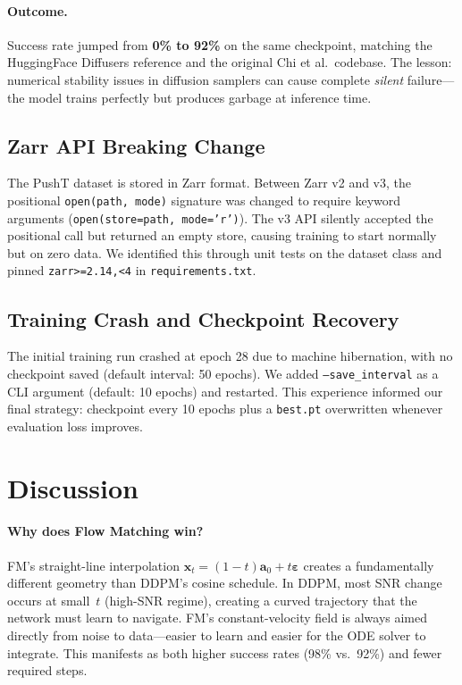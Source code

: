 \documentclass[10pt,letterpaper]{article}
\begin{document}
\paragraph{Outcome.}
Success rate jumped from \textbf{0\% to 92\%} on the same checkpoint, matching the
HuggingFace Diffusers reference and the original Chi et al.\ codebase.
The lesson: numerical stability issues in diffusion samplers can cause complete
\emph{silent} failure---the model trains perfectly but produces garbage at
inference time.

\subsection{Zarr API Breaking Change}

The PushT dataset is stored in Zarr format.
Between Zarr v2 and v3, the positional \texttt{open(path, mode)} signature was
changed to require keyword arguments (\texttt{open(store=path, mode='r')}).
The v3 API silently accepted the positional call but returned an empty store,
causing training to start normally but on zero data.
We identified this through unit tests on the dataset class and pinned
\texttt{zarr>=2.14,<4} in \texttt{requirements.txt}.

\subsection{Training Crash and Checkpoint Recovery}

The initial training run crashed at epoch 28 due to machine hibernation, with no
checkpoint saved (default interval: 50 epochs).
We added \texttt{--save\_interval} as a CLI argument (default: 10 epochs) and
restarted.
This experience informed our final strategy: checkpoint every 10 epochs plus a
\texttt{best.pt} overwritten whenever evaluation loss improves.

\section{Discussion}

\paragraph{Why does Flow Matching win?}
FM's straight-line interpolation
$\mathbf{x}_t = (1{-}t)\mathbf{a}_0 + t\boldsymbol{\varepsilon}$
creates a fundamentally different geometry than DDPM's cosine schedule.
In DDPM, most SNR change occurs at small~$t$ (high-SNR regime), creating a curved
trajectory that the network must learn to navigate.
FM's constant-velocity field is always aimed directly from noise to data---easier
to learn and easier for the ODE solver to integrate.
This manifests as both higher success rates (98\% vs.\ 92\%) and fewer required
steps.
\end{document}
